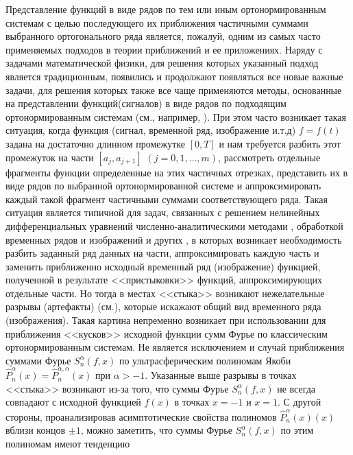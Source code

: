 Представление функций в виде рядов по тем или иным ортонормированным системам с целью последующего их приближения
частичными суммами выбранного ортогонального ряда является, пожалуй, одним из самых часто применяемых подходов в теории приближений и ее приложениях. Наряду с задачами математической физики, для решения которых указанный подход является традиционным, появились и продолжают появляться все новые важные задачи, для решения которых также все чаще применяются методы, основанные на представлении функций(сигналов) в виде рядов по подходящим ортонормированным системам (см., например, \cite{dedus3, pash4, arush5, tref6, tref7, muku8, malvarSign}). При этом часто возникает такая ситуация, когда функция (сигнал, временной ряд, изображение и.т.д) $f=f(t)$ задана на достаточно длинном промежутке $[0,T]$ и нам требуется разбить этот промежуток на части $[a_j,a_{j+1}]$ $(j=0,1,\ldots,m)$, рассмотреть отдельные фрагменты функции определенные на этих частичных отрезках, представить их в виде рядов по выбранной ортонормированной системе и аппроксимировать каждый такой фрагмент частичными суммами соответствующего ряда. Такая ситуация является типичной для задач, связанных с решением нелинейных дифференциальных уравнений численно-аналитическими методами \cite{pash4, tref6}, обработкой временных рядов и изображений и других \cite{arush5,tref6,tref7}, в которых
возникает необходимость разбить заданный ряд данных на части,
аппроксимировать каждую часть и заменить приближенно исходный
временный ряд (изображение) функцией, полученной в результате
<<пристыковки>> функций, аппроксимирующих отдельные части. Но тогда в
местах <<стыка>> возникают нежелательные разрывы (артефакты) (см.\cite{muku8}), которые искажают общий вид временного ряда (изображения). Такая
картина непременно возникает при использовании для приближения
<<кусков>> исходной функции сумм Фурье по классическим
ортонормированным системам. Не является исключением и случай
приближения суммами Фурье $S_n^\alpha(f,x)$ по ультрасферическим
полиномам Якоби $\hat P_n^{\alpha}(x)=\hat P_n^{\alpha,\alpha}(x)$
при $\alpha>-1$. Указанные выше разрывы в точках <<стыка>> возникают
из-за того, что суммы Фурье $S_n^\alpha(f,x)$ не всегда совпадают с
исходной функцией $f(x)$ в точках $x=-1$ и $x=1$. С другой стороны,
проанализировав асимптотические свойства полиномов $\hat
P_n^{\alpha}(x)(x)$ вблизи концов $\pm1$,  можно заметить,
что суммы Фурье $S_n^\alpha(f,x)$ по этим полиномам имеют тенденцию

